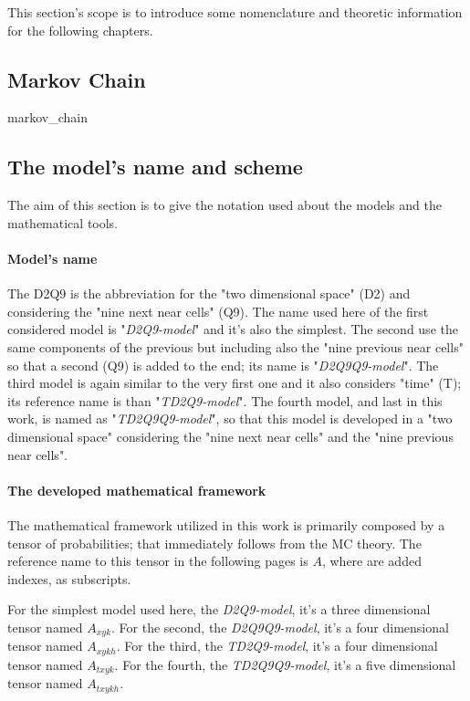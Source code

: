 \documentclass[class=article, crop=false]{standalone}
\begin{document}
This section's scope is to introduce some nomenclature and theoretic information for the following chapters.

\subsection{Markov Chain} %
	{markov_chain}
	

\FloatBarrier
\subsection{The model's name and scheme}
The aim of this section is to give the notation used about the models and the mathematical tools.

\paragraph{Model's name}
The D2Q9 is the abbreviation for the "two dimensional space" (D2) and considering the "nine next near cells" (Q9).
The name used here of the first considered model is "\emph{D2Q9-model}" and it's also the simplest.
The second use the same components of the previous but including also the "nine previous near cells" so that a second (Q9) is added to the end; its name is "\emph{D2Q9Q9-model}".
The third model is again similar to the very first one and it also considers "time" (T); its reference name is than "\emph{TD2Q9-model}".
The fourth model, and last in this work, is named as "\emph{TD2Q9Q9-model}", so that this model is developed in a "two dimensional space" considering the "nine next near cells" and the "nine previous near cells".


\paragraph{The developed mathematical framework}
The mathematical framework utilized in this work is primarily composed by a tensor of probabilities; that immediately follows from the MC theory.
The reference name to this tensor in the following pages is $A$, where are added indexes, as subscripts.

For the simplest model used here, the \emph{D2Q9-model}, it's a three dimensional tensor named $A_{x y k}$.
For the second, the \emph{D2Q9Q9-model}, it's a four dimensional tensor named $A_{x y k h}$.
For the third, the \emph{TD2Q9-model}, it's a four dimensional tensor named $A_{t x y k}$.
For the fourth, the \emph{TD2Q9Q9-model}, it's a five dimensional tensor named $A_{t x y k h}$.


\end{document}
